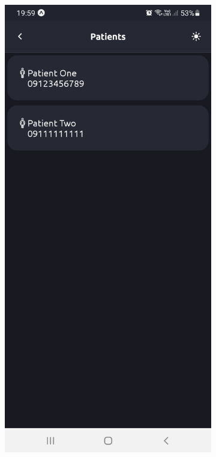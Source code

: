 \begin{figure}[H]
	\begin{center}
		\begin{subfigure}{.24\textwidth}
			\includegraphics[width=.95\linewidth]{figs/app_patients}

\end{subfigure}
\end{center}
\end{figure}
